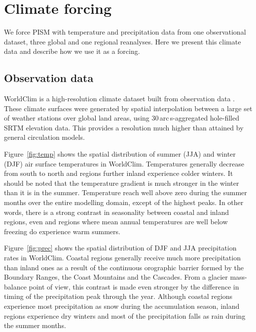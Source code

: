 \section{Climate forcing}
\label{sec:climate}

We force PISM with temperature and precipitation data from one observational dataset, three global and one regional reanalyses. Here we present this climate data and describe how we use it as a forcing.

\subsection{Observation data}

WorldClim is a high-resolution climate dataset built from observation data \citep{data:worldclim}. These climate surfaces were generated by spatial interpolation between a large set of weather stations over global land areas, using 30\,arc\,s-aggregated hole-filled SRTM elevation data. This provides a resolution much higher than attained by general circulation models.

Figure~\ref{fig:temp} shows the spatial distribution of summer (JJA) and winter (DJF) air surface temperatures in WorldClim. Temperatures generally decrease from south to north and regions further inland experience colder winters. It should be noted that the temperature gradient is much stronger in the winter than it is in the summer. Temperature reach well above zero during the summer months over the entire modelling domain, except of the highest peaks. In other words, there is a strong contrast in seasonality between coastal and inland regions, even and regions where mean annual temperatures are well below freezing do experience warm summers.

Figure~\ref{fig:prec} shows the spatial distribution of DJF and JJA precipitation rates in WorldClim. Coastal regions generally receive much more precipitation than inland ones as a result of the continuous orographic barrier formed by the Boundary Ranges, the Coast Mountains and the Cascades. From a glacier mass-balance point of view, this contrast is made even stronger by the difference in timing of the precipitation peak through the year. Although coastal regions experience most precipitation as snow during the accumulation season, inland regions experience dry winters and most of the precipitation falls as rain during the summer months.

